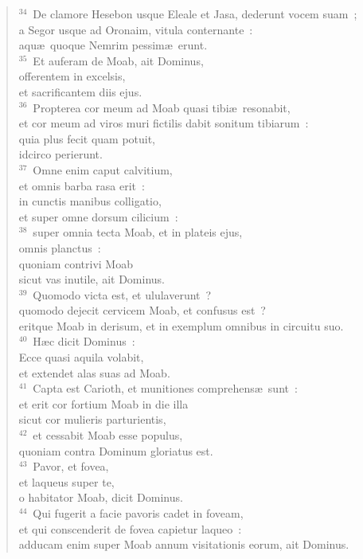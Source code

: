 \begin{verse}
${}^{34}$~De clamore Hesebon usque Eleale et Jasa, dederunt vocem suam~;\\ a Segor usque ad Oronaim, vitula conternante~:\\ aqu\ae\ quoque Nemrim pessim\ae\ erunt.\\
${}^{35}$~Et auferam de Moab, ait Dominus,\\ offerentem in excelsis,\\ et sacrificantem diis ejus.\\
${}^{36}$~Propterea cor meum ad Moab quasi tibi\ae\ resonabit,\\ et cor meum ad viros muri fictilis dabit sonitum tibiarum~:\\ quia plus fecit quam potuit,\\ idcirco perierunt.\\
${}^{37}$~Omne enim caput calvitium,\\ et omnis barba rasa erit~:\\ in cunctis manibus colligatio,\\ et super omne dorsum cilicium~:\\
${}^{38}$~super omnia tecta Moab, et in plateis ejus,\\ omnis planctus~:\\ quoniam contrivi Moab\\ sicut vas inutile, ait Dominus.\\
${}^{39}$~Quomodo victa est, et ululaverunt~?\\ quomodo dejecit cervicem Moab, et confusus est~?\\ eritque Moab in derisum, et in exemplum omnibus in circuitu suo.\\
${}^{40}$~H\ae c dicit Dominus~:\\ Ecce quasi aquila volabit,\\ et extendet alas suas ad Moab.\\
${}^{41}$~Capta est Carioth, et munitiones comprehens\ae\ sunt~:\\ et erit cor fortium Moab in die illa\\ sicut cor mulieris parturientis,\\
${}^{42}$~et cessabit Moab esse populus,\\ quoniam contra Dominum gloriatus est.\\
${}^{43}$~Pavor, et fovea,\\ et laqueus super te,\\ o habitator Moab, dicit Dominus.\\
${}^{44}$~Qui fugerit a facie pavoris cadet in foveam,\\ et qui conscenderit de fovea capietur laqueo~:\\ adducam enim super Moab annum visitationis eorum, ait Dominus.\\

\end{verse}
